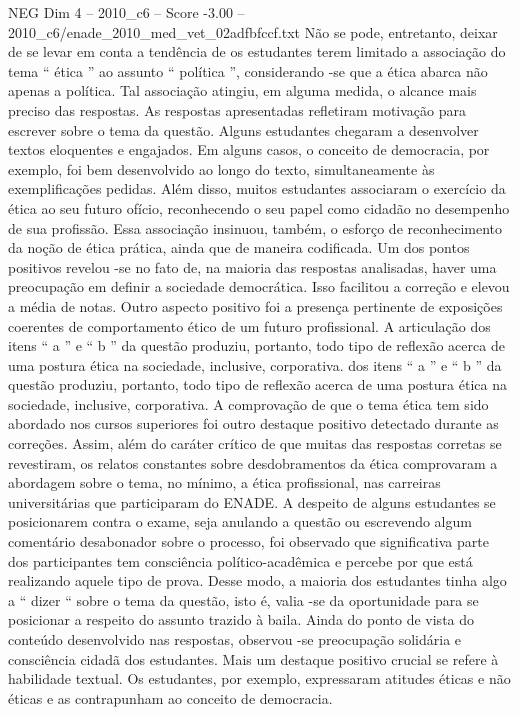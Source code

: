 \begin{textsample}{NEG Dim 4 – 2010\_c6 – Score -3.00 – 2010\_c6/enade\_2010\_med\_vet\_02adfbfccf.txt}
Não se pode, entretanto, deixar de se levar em conta a tendência de os estudantes terem limitado a associação do tema “ ética ” ao assunto “ política ”, considerando -se que a ética abarca não apenas a política.
Tal associação atingiu, em alguma medida, o alcance mais preciso das respostas.
As respostas apresentadas refletiram motivação para escrever sobre o tema da questão.
Alguns estudantes chegaram a desenvolver textos eloquentes e engajados.
Em alguns casos, o conceito de democracia, por exemplo, foi bem desenvolvido ao longo do texto, simultaneamente às exemplificações pedidas.
Além disso, muitos estudantes associaram o exercício da ética ao seu futuro ofício, reconhecendo o seu papel como cidadão no desempenho de sua profissão.
Essa associação insinuou, também, o esforço de reconhecimento da noção de ética prática, ainda que de maneira codificada.
Um dos pontos positivos revelou -se no fato de, na maioria das respostas analisadas, haver uma preocupação em definir a sociedade democrática.
Isso facilitou a correção e elevou a média de notas.
Outro aspecto positivo foi a presença pertinente de exposições coerentes de comportamento ético de um futuro profissional.
A articulação dos itens “ a ” e “ b ” da questão produziu, portanto, todo tipo de reflexão acerca de uma postura ética na sociedade, inclusive, corporativa. dos itens “ a ” e “ b ” da questão produziu, portanto, todo tipo de reflexão acerca de uma postura ética na sociedade, inclusive, corporativa.
A comprovação de que o tema ética tem sido abordado nos cursos superiores foi outro destaque positivo detectado durante as correções.
Assim, além do caráter crítico de que muitas das respostas corretas se revestiram, os relatos constantes sobre desdobramentos da ética comprovaram a abordagem sobre o tema, no mínimo, a ética profissional, nas carreiras universitárias que participaram do ENADE.
A despeito de alguns estudantes se posicionarem contra o exame, seja anulando a questão ou escrevendo algum comentário desabonador sobre o processo, foi observado que significativa parte dos participantes tem consciência político-acadêmica e percebe por que está realizando aquele tipo de prova.
Desse modo, a maioria dos estudantes tinha algo a “ dizer “ sobre o tema da questão, isto é, valia -se da oportunidade para se posicionar a respeito do assunto trazido à baila.
Ainda do ponto de vista do conteúdo desenvolvido nas respostas, observou -se preocupação solidária e consciência cidadã dos estudantes.
Mais um destaque positivo crucial se refere à habilidade textual.
Os estudantes, por exemplo, expressaram atitudes éticas e não éticas e as contrapunham ao conceito de democracia.

\end{textsample}
